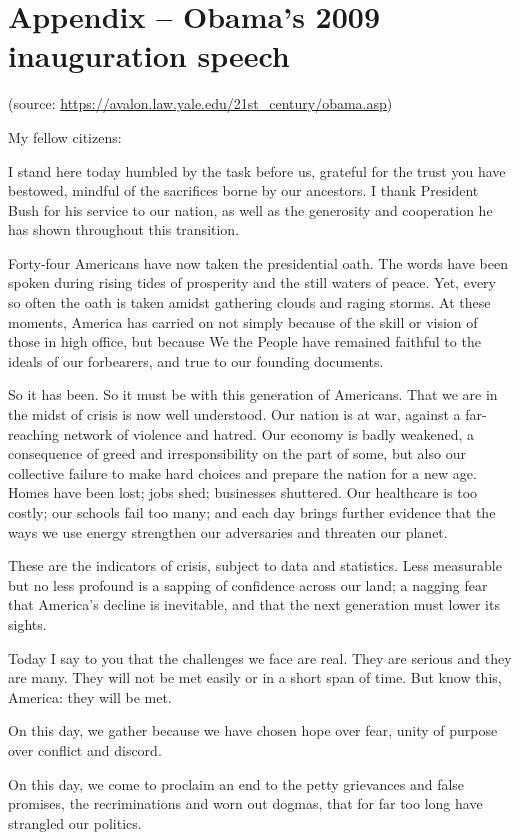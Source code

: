 \section*{Appendix -- Obama's 2009 inauguration speech}{
(source: \url{https://avalon.law.yale.edu/21st_century/obama.asp})

My fellow citizens:

I stand here today humbled by the task before us, grateful for the trust you have bestowed, mindful of the sacrifices borne by our ancestors. I thank President Bush for his service to our nation, as well as the generosity and cooperation he has shown throughout this transition.

Forty-four Americans have now taken the presidential oath. The words have been spoken during rising tides of prosperity and the still waters of peace. Yet, every so often the oath is taken amidst gathering clouds and raging storms. At these moments, America has carried on not simply because of the skill or vision of those in high office, but because We the People have remained faithful to the ideals of our forbearers, and true to our founding documents.

So it has been. So it must be with this generation of Americans. That we are in the midst of crisis is now well understood. Our nation is at war, against a far-reaching network of violence and hatred. Our economy is badly weakened, a consequence of greed and irresponsibility on the part of some, but also our collective failure to make hard choices and prepare the nation for a new age. Homes have been lost; jobs shed; businesses shuttered. Our healthcare is too costly; our schools fail too many; and each day brings further evidence that the ways we use energy strengthen our adversaries and threaten our planet.

These are the indicators of crisis, subject to data and statistics. Less measurable but no less profound is a sapping of confidence across our land; a nagging fear that America's decline is inevitable, and that the next generation must lower its sights.

Today I say to you that the challenges we face are real. They are serious and they are many. They will not be met easily or in a short span of time. But know this, America: they will be met.

On this day, we gather because we have chosen hope over fear, unity of purpose over conflict and discord.

On this day, we come to proclaim an end to the petty grievances and false promises, the recriminations and worn out dogmas, that for far too long have strangled our politics.

}
